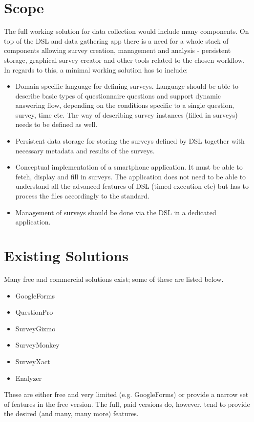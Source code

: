 \section{Scope}
\label{sec:Scope}
The full working solution for data collection would include many components. On top of the DSL and data gathering app there is a need for a whole stack of components allowing survey creation, management and analysis - persistent storage, graphical survey creator and other tools related to the chosen workflow. In regards to this, a minimal working solution has to include:
\begin{itemize}
\item Domain-specific language for defining surveys. Language should be able to describe basic types of questionnaire questions and support dynamic answering flow, depending on the conditions specific to a single question, survey, time etc. The way of describing survey instances (filled in surveys) needs to be defined as well.
\item Persistent data storage for storing the surveys defined by DSL together with necessary metadata and results of the surveys.
\item Conceptual implementation of a smartphone application. It must be able to fetch, display and fill in surveys. The application does not need to be able to understand all the advanced features of DSL (timed execution etc) but has to process the files accordingly to the standard.
\item Management of surveys should be done via the DSL in a dedicated application.
\end{itemize}

\section{Existing Solutions}
\label{sec:existingsolutions}
Many free and commercial solutions exist; some of these are listed below.
\begin{itemize}
\item GoogleForms
\item QuestionPro
\item SurveyGizmo
\item SurveyMonkey
\item SurveyXact
\item Enalyzer
\end{itemize}
  
These are either free and very limited (e.g. GoogleForms) or provide a narrow set of features in the free version. The full, paid versions do, however, tend to provide the desired (and many, many more) features.

